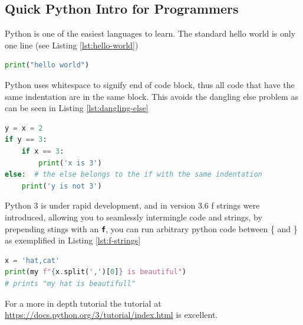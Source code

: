 \documentclass[]{report}   %
\begin{document}
\subsection{Quick Python Intro for Programmers}
Python is one of the easiest languages to learn. The standard hello world is
only one line (see Listing \ref{lst:hello-world})

\begin{minipage}{\linewidth}
\begin{lstlisting}[language=python, label={lst:hello-world}, 
                   caption={Python hello world}]
print("hello world")
\end{lstlisting}
\end{minipage}

Python uses whitespace to signify end of code block, thus all code that have
the same indentation are in the same block. This avoids the dangling else
problem\cite{dangling_else} as can be seen in Listing \ref{lst:dangling-else}

\begin{minipage}{\linewidth}
\begin{lstlisting}[language=python, label={lst:dangling-else}, 
                   caption={Python: no dangling else}]
y = x = 2
if y == 3:
    if x == 3:
        print('x is 3')
else:  # the else belongs to the if with the same indentation
    print('y is not 3')
\end{lstlisting}
\end{minipage}

Python 3 is under rapid development, and in version 3.6 f strings were
introduced, allowing you to seamlessly intermingle code and strings, by
prepending stings with an \textbf{\texttt{f}}, you can run arbitrary python
code between \{ and \} as exemplified in Listing \ref{lst:f-strings}

\begin{minipage}{\linewidth}
\begin{lstlisting}[language=python, label={lst:f-strings}, 
                   caption={Python: f strings}]
x = 'hat,cat'
print(my f"{x.split(',')[0]} is beautiful")
# prints "my hat is beautifull"
\end{lstlisting}
\end{minipage}

For a more in depth tutorial the tutorial at \url{
https://docs.python.org/3/tutorial/index.html} is excellent.

\end{document}
